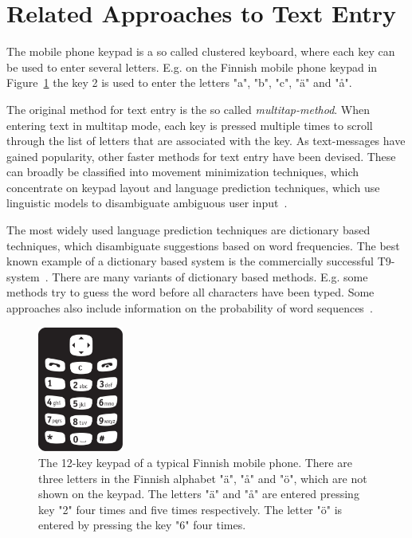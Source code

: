\documentclass{llncs}
\begin{document}
\section{Related Approaches to Text Entry}\label{earlier-work}

The mobile phone keypad is a so called clustered keyboard, where each
key can be used to enter several letters. E.g. on the Finnish mobile
phone keypad in Figure~\ref{keypad} the key 2 is used to enter the
letters "a", "b", "c", "\"{a}" and "å".

The original method for text entry is the so called
\textit{multitap-method}. When entering text in multitap mode, each key is
pressed multiple times to scroll through the list of letters that are
associated with the key. As text-messages have gained popularity, other
faster methods for text entry have been devised. These can broadly be
classified into movement minimization techniques, which concentrate on
keypad layout and language prediction techniques, which use linguistic
models to disambiguate ambiguous user input~\cite{Mackenzie/HCI/2002}.

The most widely used language prediction techniques are dictionary
based techniques, which disambiguate suggestions based on word
frequencies. The best known example of a dictionary based system is
the commercially successful T9-system~\cite{t9-patent}. There are many
variants of dictionary based methods. E.g. some methods try to guess
the word before all characters have been typed. Some approaches also
include information on the probability of word
sequences~\cite{Mackenzie/HCI/2002}.

\begin{figure}[hbt!]
\begin{center}
\includegraphics[width=1.1in]{Nappaimet.pdf}
\caption{The 12-key keypad of a typical Finnish mobile phone. There
  are three letters in the Finnish alphabet "\"{a}", "å" and "\"{o}",
  which are not shown on the keypad. The letters "\"{a}" and "å" are
  entered pressing key "2" four times and five times respectively. The
  letter "\"{o}" is entered by pressing the key "6" four
  times.}\label{keypad}
\end{center}
\end{figure}
\end{document}
